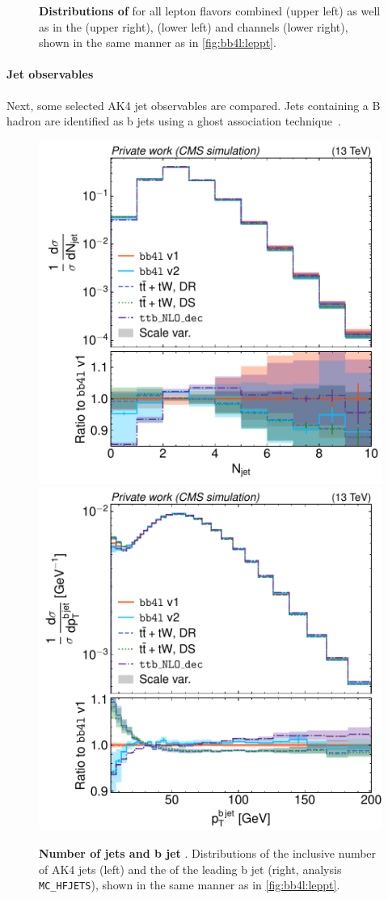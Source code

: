 \begin{figure}[tp]
    \caption{\textbf{Distributions of \mll} for all lepton flavors combined (upper left) as well as in the \emu (upper right), \ee (lower left) and \mumu channels (lower right), shown in the same manner as in \cref{fig:bb4l:leppt}.}
    \label{fig:bb4l:mll}
\end{figure}

\paragraph{Jet observables} Next, some selected AK4 jet observables are compared. 
Jets containing a B hadron are identified as b jets using a ghost association technique~\cite{Cacciari:2007fd,Cacciari:2008gn}. 

\begin{figure}[tp]
    \centering
    \includegraphics[width=0.49 \textwidth]{figures/bb4l/generators/MC_TTBAR_DILEP_SPINDENSITY_njet.pdf}
    \hfill
    \includegraphics[width=0.49 \textwidth]{figures/bb4l/generators/MC_HFJETS_ptBJetLead.pdf}
    \caption{\textbf{Number of jets and b jet \pt}. Distributions of the inclusive number of AK4 jets (left) and the \pt of the leading b jet (right, \rivet analysis \texttt{MC\_HFJETS}), shown in the same manner as in \cref{fig:bb4l:leppt}.}
    \label{fig:bb4l:jets1}
\end{figure}

